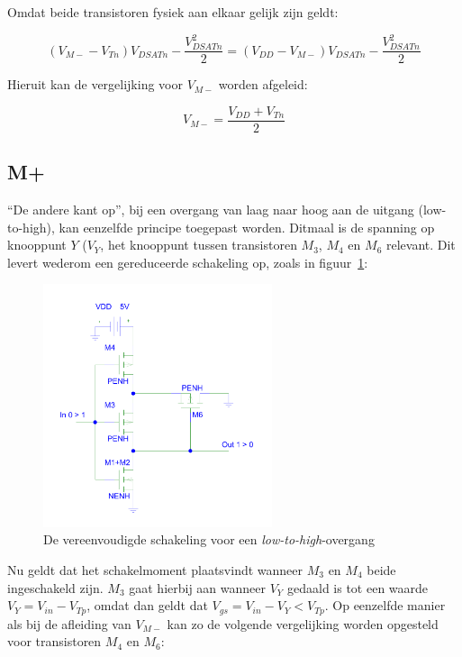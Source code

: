 \documentclass{scrartcl}  %
\begin{document}
Omdat beide transistoren fysiek aan elkaar gelijk zijn geldt:

$$(V_{M-}-V_{Tn})V_{DSATn} - \frac{V^{2}_{DSATn}}{2} = (V_{DD}-V_{M-})V_{DSATn} - \frac{V^{2}_{DSATn}}{2}$$

Hieruit kan de vergelijking voor $V_{M-}$ worden afgeleid:

\begin{equation} \label{eq:schmitt-mminus}
V_{M-} = \frac{V_{DD}+V_{Tn}}{2}
\end{equation}

\subsection{M+}
\label{subsec:trig-methode-mplus}
``De andere kant op'', bij een overgang van laag naar hoog aan de uitgang (low-to-high), kan eenzelfde principe toegepast worden. Ditmaal is de spanning op knooppunt $Y$ ($V_{Y}$, het knooppunt tussen transistoren $M_{3}$, $M_{4}$ en $M_{6}$ relevant. Dit levert wederom een gereduceerde schakeling op, zoals in figuur~\ref{fig:schmitt-schem-low-to-high}:

\begin{figure}[H]
\centering
	\includegraphics[width=0.6\textwidth]{resource/schmitt-low-to-high-rc.pdf}
	\caption{De vereenvoudigde schakeling voor een \textit{low-to-high}-overgang}
	\label{fig:schmitt-schem-low-to-high}
\end{figure}

Nu geldt dat het schakelmoment plaatsvindt wanneer $M_{3}$ en $M_{4}$ beide ingeschakeld zijn. $M_{3}$ gaat hierbij aan wanneer $V_{Y}$ gedaald is tot een waarde $V_{Y} = V_{in} - V_{Tp}$, omdat dan geldt dat $V_{gs} = V_{in} - V_{Y} < V_{Tp}$. Op eenzelfde manier als bij de afleiding van $V_{M-}$ kan zo de volgende vergelijking worden opgesteld voor transistoren $M_{4}$ en $M_{6}$:
\end{document}
